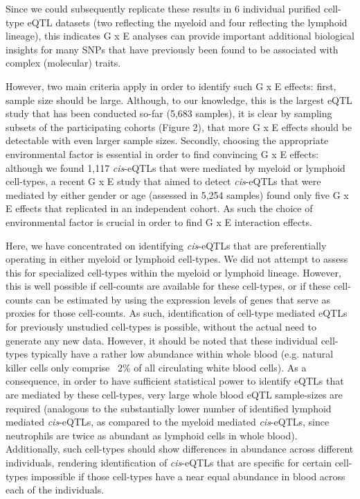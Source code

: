   Since we could subsequently replicate these results in 6 individual purified cell-type eQTL datasets 
  (two reflecting the myeloid and four reflecting the lymphoid lineage), this indicates G x E analyses 
  can provide important additional biological insights for many SNPs that have previously been found 
  to be associated with complex (molecular) traits. 

  However, two main criteria apply in order to identify such G x E effects: first, sample size should 
  be large. Although, to our knowledge, this is the largest eQTL study that has been conducted so-far 
  (5,683 samples), it is clear by sampling subsets of the participating cohorts (Figure 2), that more 
  G x E effects should be detectable with even larger sample sizes. Secondly, choosing the appropriate 
  environmental factor is essential in order to find convincing G x E effects: although we found 1,117 
  \emph{cis}-eQTLs that were mediated by myeloid or lymphoid cell-types, a recent G x E study that aimed to 
  detect \emph{cis}-eQTLs that were mediated by either gender or age (assessed in 5,254 samples) found only 
  five G x E effects that replicated in an independent cohort\cite{Whitlock:2005}. As such the choice of environmental 
  factor is crucial in order to find G x E interaction effects.

  Here, we have concentrated on identifying \emph{cis}-eQTLs that are preferentially operating in either 
  myeloid or lymphoid cell-types. We did not attempt to assess this for specialized cell-types within 
  the myeloid or lymphoid lineage. However, this is well possible if cell-counts are available for 
  these cell-types, or if these cell-counts can be estimated by using the expression levels of genes 
  that serve as proxies for those cell-counts. As such, identification of cell-type mediated eQTLs 
  for previously unstudied cell-types is possible, without the actual need to generate any new data. 
  However, it should be noted that these individual cell-types typically have a rather low abundance 
  within whole blood (e.g. natural killer cells only comprise ~2\% of all circulating white blood 
  cells). As a consequence, in order to have sufficient statistical power to identify eQTLs that are 
  mediated by these cell-types, very large whole blood eQTL sample-sizes are required (analogous to 
  the substantially lower number of identified lymphoid mediated \emph{cis}-eQTLs, as compared to the myeloid 
  mediated \emph{cis}-eQTLs, since neutrophils are twice as abundant as lymphoid cells in whole blood). 
  Additionally, such cell-types should show differences in abundance across different individuals, 
  rendering identification of \emph{cis}-eQTLs that are specific for certain cell-types impossible if those 
  cell-types have a near equal abundance in blood across each of the individuals.


